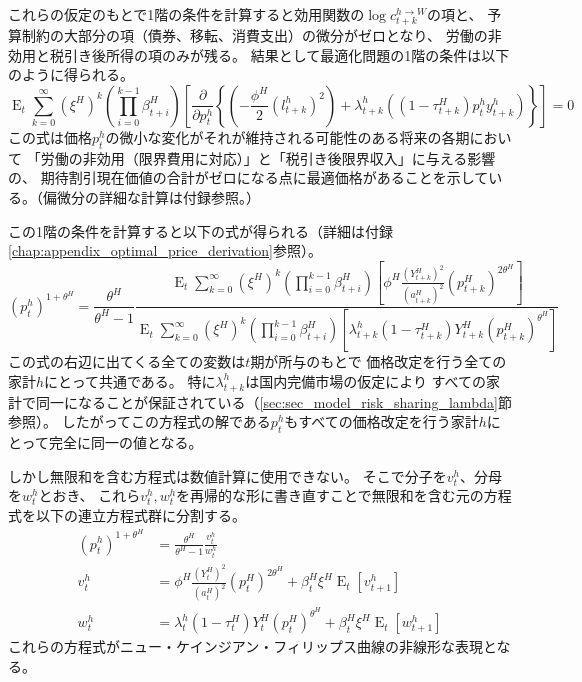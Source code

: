 これらの仮定のもとで1階の条件を計算すると効用関数の\(\log c_{t+k}^{h\to W}\)の項と、
予算制約の大部分の項（債券、移転、消費支出）の微分がゼロとなり、
労働の非効用と税引き後所得の項のみが残る。
結果として最適化問題の1階の条件は以下のように得られる。
\begin{equation}
\label{form:model_producers_optimization_home_expectation}
    \operatorname{E}_t\sum_{k=0}^{\infty}(\xi^H)^k\left(\prod_{i=0}^{k-1}\beta_{t+i}^H\right)\left[\frac{\partial}{\partial p_t^h}\left\{\left(-\frac{\phi^H}{2}(l_{t+k}^h)^2\right)+\lambda_{t+k}^h\left((1-\tau_{t+k}^H)p_t^hy_{t+k}^h\right)\right\}\right]=0
\end{equation}
この式は価格\(p_t^h\)の微小な変化がそれが維持される可能性のある将来の各期において
「労働の非効用（限界費用に対応）」と「税引き後限界収入」に与える影響の、
期待割引現在価値の合計がゼロになる点に最適価格があることを示している。（偏微分の詳細な計算は付録参照。）

この1階の条件を計算すると以下の式が得られる（詳細は付録\ref{chap:appendix_optimal_price_derivation}参照）。
\begin{equation}
\label{form:model_producers_optimization_home_p_h}
    (p_t^h)^{1+\theta^H}=\frac{\theta^H}{\theta^H-1}\frac{\operatorname{E}_t\sum_{k=0}^{\infty}(\xi^H)^k\left(\prod_{i=0}^{k-1}\beta_{t+i}^H\right)\left[\phi^H\frac{(Y_{t+k}^H)^2}{(a_{t+k}^H)^2}(p_{t+k}^H)^{2\theta^H}\right]}{\operatorname{E}_t\sum_{k=0}^{\infty}(\xi^H)^k\left(\prod_{i=0}^{k-1}\beta_{t+i}^H\right)\left[\lambda_{t+k}^h(1-\tau_{t+k}^H)Y_{t+k}^H(p_{t+k}^H)^{\theta^H}\right]}
\end{equation}
この式の右辺に出てくる全ての変数は\(t\)期が所与のもとで
価格改定を行う全ての家計\(h\)にとって共通である。
特に\(\lambda_{t+k}^h\)は国内完備市場の仮定により
すべての家計で同一になることが保証されている（\ref{sec:sec_model_risk_sharing_lambda}節参照）。
したがってこの方程式の解である\(p_t^h\)もすべての価格改定を行う家計\(h\)にとって完全に同一の値となる。

しかし無限和を含む方程式は数値計算に使用できない。
そこで分子を\(v_t^h\)、分母を\(w_t^h\)とおき、
これら\(v_t^h,w_t^h\)を再帰的な形に書き直すことで無限和を含む元の方程式を以下の連立方程式群に分割する。
\begin{align}
    \label{form:model_producers_optimization_home_p_h_modified}
        (p_t^h)^{1+\theta^H}&=\frac{\theta^H}{\theta^H-1}\frac{v_t^h}{w_t^h} \\
    \label{form:model_producers_optimization_home_v_h}
        v_t^h&=\phi^H\frac{(Y_t^H)^2}{(a_t^H)^2}(p_t^H)^{2\theta^H}+\beta_t^H\xi^H\operatorname{E}_t[v_{t+1}^h] \\
    \label{form:model_producers_optimization_home_w_h}
        w_t^h&=\lambda_t^h(1-\tau_t^H)Y_t^H(p_t^H)^{\theta^H}+\beta_t^H\xi^H\operatorname{E}_t[w_{t+1}^h]
\end{align}
これらの方程式がニュー・ケインジアン・フィリップス曲線の非線形な表現となる。

